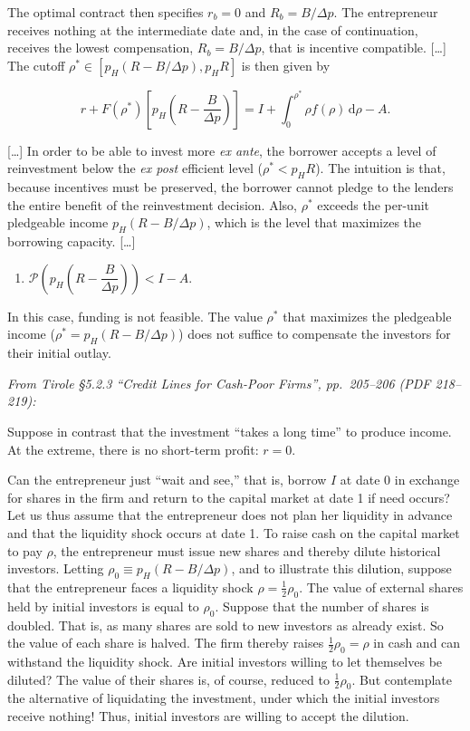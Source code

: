 \documentclass[11pt,a4paper]{article}
\providecommand{\tightlist}{\setlength{\itemsep}{0pt}\setlength{\parskip}{0pt}}
\begin{document}
The optimal contract then specifies \(r_b = 0\) and \(R_b = B/\Delta p\). The entrepreneur receives
nothing at the intermediate date and, in the case of continuation, receives the lowest compensation,
\(R_b = B/\Delta p\), that is incentive compatible. {[}\ldots{]} The cutoff
\(\rho^* \in [p_H(R - B/\Delta p), p_HR]\) is then given by

\[r + F(\rho^*)\left[p_H\left(R - \frac{B}{\Delta p}\right)\right] = I + \int_0^{\rho^*}\rho f(\rho)\,\mathrm{d}\rho - A.\]

{[}\ldots{]} In order to be able to invest more \emph{ex ante}, the borrower accepts a level of
reinvestment below the \emph{ex post} efficient level (\(\rho^* < p_HR\)). The intuition is that,
because incentives must be preserved, the borrower cannot pledge to the lenders the entire benefit
of the reinvestment decision. Also, \(\rho^*\) exceeds the per-unit pledgeable income
\(p_H(R - B/\Delta p)\), which is the level that maximizes the borrowing capacity. {[}\ldots{]}

\begin{enumerate}
\def\labelenumi{(\roman{enumi})}
\setcounter{enumi}{2}
\tightlist
\item
  \(\mathcal{P}\left(p_H\left(R - \dfrac{B}{\Delta p}\right)\right) < I - A\).
\end{enumerate}

In this case, funding is not feasible. The value \(\rho^*\) that maximizes the pledgeable income
(\(\rho^* = p_H(R - B/\Delta p)\)) does not suffice to compensate the investors for their initial
outlay.

\emph{From Tirole §5.2.3 ``Credit Lines for Cash-Poor Firms'', pp.~205--206 (PDF 218--219):}

Suppose in contrast that the investment ``takes a long time'' to produce income. At the extreme,
there is no short-term profit: \(r = 0\).

Can the entrepreneur just ``wait and see,'' that is, borrow \(I\) at date 0 in exchange for shares
in the firm and return to the capital market at date 1 if need occurs? Let us thus assume that the
entrepreneur does not plan her liquidity in advance and that the liquidity shock occurs at date 1.
To raise cash on the capital market to pay \(\rho\), the entrepreneur must issue new shares and
thereby dilute historical investors. Letting \(\rho_0 \equiv p_H(R - B/\Delta p)\), and to
illustrate this dilution, suppose that the entrepreneur faces a liquidity shock
\(\rho = \frac12\rho_0\). The value of external shares held by initial investors is equal to
\(\rho_0\). Suppose that the number of shares is doubled. That is, as many shares are sold to new
investors as already exist. So the value of each share is halved. The firm thereby raises
\(\frac12\rho_0 = \rho\) in cash and can withstand the liquidity shock. Are initial investors
willing to let themselves be diluted? The value of their shares is, of course, reduced to
\(\frac12\rho_0\). But contemplate the alternative of liquidating the investment, under which the
initial investors receive nothing! Thus, initial investors are willing to accept the dilution.
\end{document}
